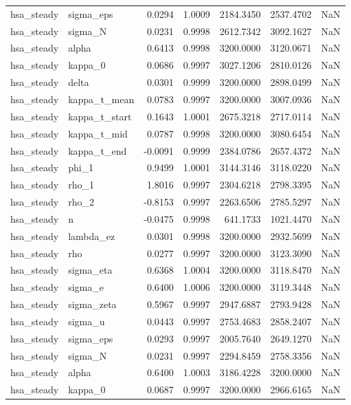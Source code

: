 \begin{tabular}{llrrrrl}
hsa\_steady & sigma\_eps & 0.0294 & 1.0009 & 2184.3450 & 2537.4702 & NaN \\
hsa\_steady & sigma\_N & 0.0231 & 0.9998 & 2612.7342 & 3092.1627 & NaN \\
hsa\_steady & alpha & 0.6413 & 0.9998 & 3200.0000 & 3120.0671 & NaN \\
hsa\_steady & kappa\_0 & 0.0686 & 0.9997 & 3027.1206 & 2810.0126 & NaN \\
hsa\_steady & delta & 0.0301 & 0.9999 & 3200.0000 & 2898.0499 & NaN \\
hsa\_steady & kappa\_t\_mean & 0.0783 & 0.9997 & 3200.0000 & 3007.0936 & NaN \\
hsa\_steady & kappa\_t\_start & 0.1643 & 1.0001 & 2675.3218 & 2717.0114 & NaN \\
hsa\_steady & kappa\_t\_mid & 0.0787 & 0.9998 & 3200.0000 & 3080.6454 & NaN \\
hsa\_steady & kappa\_t\_end & -0.0091 & 0.9999 & 2384.0786 & 2657.4372 & NaN \\
hsa\_steady & phi\_1 & 0.9499 & 1.0001 & 3144.3146 & 3118.0220 & NaN \\
hsa\_steady & rho\_1 & 1.8016 & 0.9997 & 2304.6218 & 2798.3395 & NaN \\
hsa\_steady & rho\_2 & -0.8153 & 0.9997 & 2263.6506 & 2785.5297 & NaN \\
hsa\_steady & n & -0.0475 & 0.9998 & 641.1733 & 1021.4470 & NaN \\
hsa\_steady & lambda\_ez & 0.0301 & 0.9998 & 3200.0000 & 2932.5699 & NaN \\
hsa\_steady & rho & 0.0277 & 0.9997 & 3200.0000 & 3123.3090 & NaN \\
hsa\_steady & sigma\_eta & 0.6368 & 1.0004 & 3200.0000 & 3118.8470 & NaN \\
hsa\_steady & sigma\_e & 0.6400 & 1.0006 & 3200.0000 & 3119.3448 & NaN \\
hsa\_steady & sigma\_zeta & 0.5967 & 0.9997 & 2947.6887 & 2793.9428 & NaN \\
hsa\_steady & sigma\_u & 0.0443 & 0.9997 & 2753.4683 & 2858.2407 & NaN \\
hsa\_steady & sigma\_eps & 0.0293 & 0.9997 & 2005.7640 & 2649.1270 & NaN \\
hsa\_steady & sigma\_N & 0.0231 & 0.9997 & 2294.8459 & 2758.3356 & NaN \\
hsa\_steady & alpha & 0.6400 & 1.0003 & 3186.4228 & 3200.0000 & NaN \\
hsa\_steady & kappa\_0 & 0.0687 & 0.9997 & 3200.0000 & 2966.6165 & NaN \\

\end{tabular}
